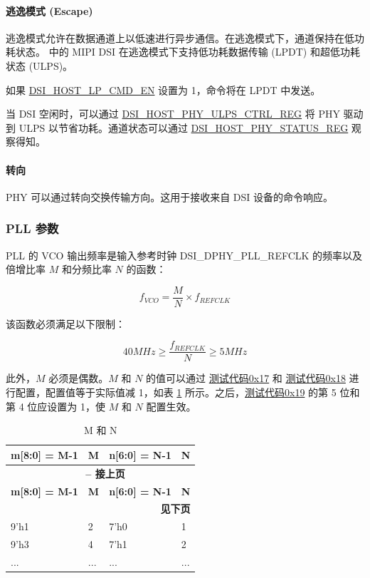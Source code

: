 \documentclass[main\_\_CN.tex]{subfiles}
\begin{document}
\paragraph{逃逸模式 (Escape)}
逃逸模式允许在数据通道上以低速进行异步通信。在逃逸模式下，通道保持在低功耗状态。 \chipname{} 中的 MIPI DSI 在逃逸模式下支持低功耗数据传输 (LPDT) 和超低功耗状态 (ULPS)。

如果 \hyperref[fielddesc:DSIHOSTLPCMDEN]{DSI\_HOST\_LP\_CMD\_EN} 设置为 1，命令将在 LPDT 中发送。

当 DSI 空闲时，可以通过 \hyperref[regdesc:DSIHOSTPHYULPSCTRLREG]{DSI\_HOST\_PHY\_ULPS\_CTRL\_REG} 将 PHY 驱动到 ULPS 以节省功耗。通道状态可以通过 \hyperref[regdesc:DSIHOSTPHYSTATUSREG]{DSI\_HOST\_PHY\_STATUS\_REG} 观察得知。

\paragraph{转向}
PHY 可以通过转向交换传输方向。这用于接收来自 DSI 设备的命令响应。

\subsubsection{PLL 参数}
\label{sec:pll-parameters}
PLL 的 VCO 输出频率是输入参考时钟 DSI\_DPHY\_PLL\_REFCLK 的频率以及倍增比率 $M$ 和分频比率 $N$ 的函数：

\[
f_{VCO} = \frac{M}{N} \times f_{REFCLK}
\]

该函数必须满足以下限制：

\[
40MHz \geq \frac{f_{REFCLK}}{N} \geq 5MHz
\]

此外，$M$ 必须是偶数。$M$ 和 $N$ 的值可以通过 \hyperref[sec:test-code-0x17]{测试代码0x17} 和 \hyperref[sec:test-code-0x18]{测试代码0x18} 进行配置，配置值等于实际值减 1，如表 \ref{tab:m-n-ratios} 所示。之后，\hyperref[sec:test-code-0x19]{测试代码0x19} 的第 5 位和第 4 位应设置为 1，使 $M$ 和 $N$ 配置生效。

\begin{longtable}{|p{3cm}|p{2cm}|p{3cm}|p{2cm}|}
    \caption{M 和 N} \label{tab:m-n-ratios} \\
    \hline
    \rowcolor{lightgray}
    \textbf{m[8:0] = M-1} & \textbf{M} & \textbf{n[6:0] = N-1} & \textbf{N} \\ \hline
    \endfirsthead

    \multicolumn{4}{c}{\bfseries \tablename\ \thetable{} -- 接上页}\\\hline
    \rowcolor{lightgray}
    \textbf{m[8:0] = M-1} & \textbf{M} & \textbf{n[6:0] = N-1} & \textbf{N} \\ \hline
    \endhead

    \multicolumn{4}{r}{\textbf{见下页}} \\
    \endfoot

    \endlastfoot
    
    9'h1 & 2 & 7'h0 & 1  \\ \hline
    9'h3 & 4 & 7'h1 & 2  \\ \hline
    ... & ... & ... & ...  \\ \hline
\end{longtable}
\end{document}
